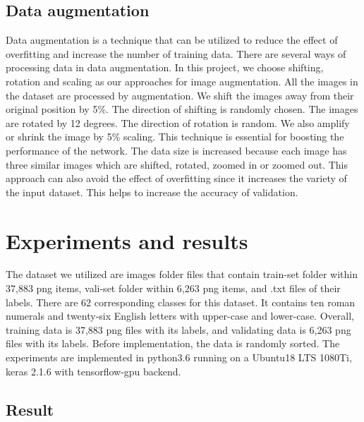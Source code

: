 \documentclass[twoside,twocolumn,10.8pt]{article}
\begin{document}
\subsection{Data augmentation}

Data augmentation is a technique that can be utilized to reduce the effect of overfitting and increase the number of training data. There are several ways of processing data in data augmentation. In this project, we choose shifting, rotation and scaling as our approaches for image augmentation. All the images in the dataset are processed by augmentation. We shift the images away from their original position by 5\%. The direction of shifting is randomly chosen. The images are rotated by 12 degrees. The direction of rotation is random. We also amplify or shrink the image by 5\% scaling. This technique is essential for boosting the performance of the network. The data size is increased because each image has three similar images which are shifted, rotated, zoomed in or zoomed out. This approach can also avoid the effect of overfitting since it increases the variety of the input dataset. This helps to increase the accuracy of validation. 

\section{Experiments and results}

The dataset we utilized are images folder files that contain train-set folder within 37,883 png items, vali-set folder within 6,263 png items, and .txt files of their labels. There are 62 corresponding classes for this dataset. It contains ten roman numerals and twenty-six English letters  with upper-case and lower-case. Overall, training data is 37,883 png files with its labels, and validating data is 6,263 png files with its labels. Before implementation, the data is randomly sorted. The experiments are implemented in python3.6 running on a Ubuntu18 LTS 1080Ti, keras 2.1.6 with tensorflow-gpu backend.

\subsection{Result}
\end{document}
